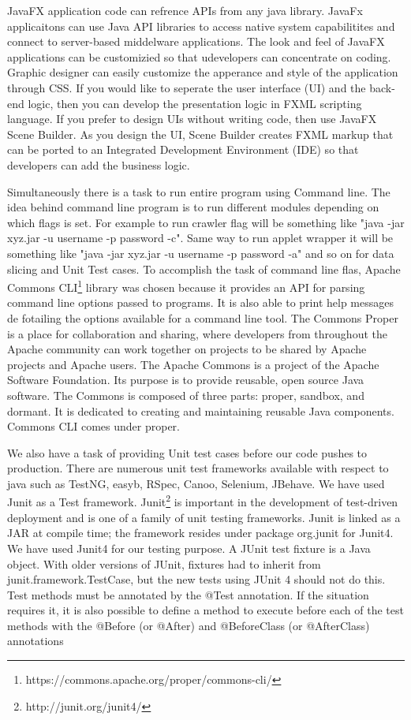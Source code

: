 \documentclass[article,type=msc,colorback,accentcolor=tud9c,twoside,11pt]{tudthesis}
\begin{document}
JavaFX application code can refrence APIs from any java library. JavaFx applicaitons can use Java API libraries to access native system capabilitites and connect to server-based middelware applications. The look and feel of JavaFX applications can be customizied so that udevelopers can concentrate on coding. Graphic designer can easily customize the apperance and style of the application through CSS. If you would like to seperate the user interface (UI) and the back-end logic, then you can develop the presentation logic in FXML scripting language. If you prefer to design UIs without writing code, then use JavaFX Scene Builder. As you design the UI, Scene Builder creates FXML markup that can be ported to an Integrated Development Environment (IDE) so that developers can add the business logic.

Simultaneously there is a task to run entire program using Command line. The idea behind command line program is to run different modules depending on which flags is set. For example to run crawler flag will be something like "java -jar xyz.jar -u username -p password -c". Same way to run applet wrapper it will be something like  "java -jar xyz.jar -u username -p password -a" and so on for data slicing and Unit Test cases. To accomplish the task of command line flas, Apache Commons CLI\footnote{https://commons.apache.org/proper/commons-cli/} library was chosen because it provides an API for parsing command line options passed to programs. It is also able to print help messages de fotailing the options available for a command line tool. The Commons Proper is a place for collaboration and sharing, where developers from throughout the Apache community can work together on projects to be shared by Apache projects and Apache users. The Apache Commons is a project of the Apache Software Foundation. Its purpose is to provide reusable, open source Java software. The Commons is composed of three parts: proper, sandbox, and dormant. It is dedicated to creating and maintaining reusable Java components. Commons CLI comes under proper.

We also have a task of providing Unit test cases before our code pushes to production. There are numerous unit test frameworks available with respect to java such as TestNG, easyb, RSpec, Canoo, Selenium, JBehave. We have used Junit as a Test framework. Junit\footnote{http://junit.org/junit4/} is important in the development of test-driven deployment and is one of a family of unit testing frameworks. Junit is linked as a JAR at compile time; the framework resides under package org.junit for Junit4. We have used Junit4 for our testing purpose. A JUnit test fixture is a Java object. With older versions of JUnit, fixtures had to inherit from junit.framework.TestCase, but the new tests using JUnit 4 should not do this. Test methods must be annotated by the @Test annotation. If the situation requires it, it is also possible to define a method to execute before  each of the test methods with the @Before (or @After) and @BeforeClass (or @AfterClass) annotations
\end{document}
